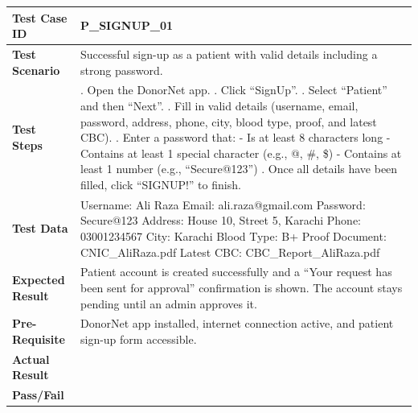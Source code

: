 \documentclass[11pt]{article}
\begin{document}
\noindent
\begin{tabularx}{\textwidth}{|>{\raggedright\arraybackslash}p{}|>{\raggedright\arraybackslash}X|}
\hline
\textbf{Test Case ID} & P\_SIGNUP\_01 \\
\hline
\textbf{Test Scenario} & Successful sign-up as a patient with valid details including a strong password. \\
\hline
\textbf{Test Steps} & 1. Open the DonorNet app. \newline
2. Click ``SignUp''. \newline
3. Select ``Patient'' and then ``Next''. \newline
4. Fill in valid details (username, email, password, address, phone, city, blood type, proof, and latest CBC). \newline
5. Enter a password that: \newline
\hspace*{1em}- Is at least 8 characters long \newline
\hspace*{1em}- Contains at least 1 special character (e.g., @, \#, \$) \newline
\hspace*{1em}- Contains at least 1 number (e.g., ``Secure@123'') \newline
6. Once all details have been filled, click ``SIGNUP!'' to finish. \\
\hline
\textbf{Test Data} & Username: Ali Raza \newline
Email: ali.raza@gmail.com \newline
Password: Secure@123 \newline
Address: House 10, Street 5, Karachi \newline
Phone: 03001234567 \newline
City: Karachi \newline
Blood Type: B+ \newline
Proof Document: CNIC\_AliRaza.pdf \newline
Latest CBC: CBC\_Report\_AliRaza.pdf \\
\hline
\textbf{Expected Result} & Patient account is created successfully and a ``Your request has been sent for approval'' confirmation is shown. The account stays pending until an admin approves it. \\
\hline
\textbf{Pre-Requisite} & DonorNet app installed, internet connection active, and patient sign-up form accessible. \\
\hline
\textbf{Actual Result} &  \\
\hline
\textbf{Pass/Fail} &  \\
\hline
\end{tabularx}
\vspace{1em}
\end{document}
